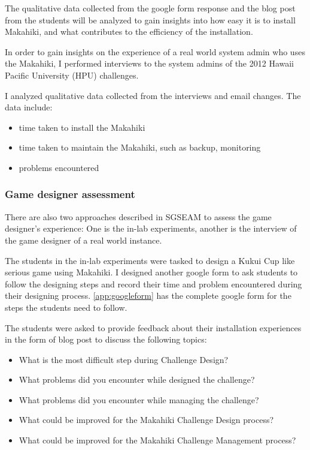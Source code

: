 The qualitative data collected from the google form response and the blog post from the students will be analyzed to gain insights into how easy it is to install Makahiki, and what contributes to the efficiency of the installation.

In order to gain insights on the experience of a real world system admin who uses the Makahiki, I performed interviews to the system admins of the 2012 Hawaii Pacific University (HPU) challenges.

I analyzed qualitative data collected from the interviews and email changes. The data include:
\begin{itemize}
 \item time taken to install the Makahiki
 \item time taken to maintain the Makahiki, such as backup, monitoring
 \item problems encountered
\end{itemize}

\subsubsection{Game designer assessment}

There are also two approaches described in SGSEAM to assess the game designer's experience: One is the in-lab experiments, another is the interview of the game designer of a real world instance.

The students in the in-lab experiments were tasked to design a Kukui Cup like serious game using Makahiki. I designed another google form to ask students to follow the designing steps and record their time and problem encountered during their designing process. \autoref{app:googleform} has the complete google form for the steps the students need to follow.

The students were asked to provide feedback about their installation experiences in the form of blog post to discuss the following topics:
\begin{itemize}
\item What is the most difficult step during Challenge Design?
\item What problems did you encounter while designed the challenge?
\item What problems did you encounter while managing the challenge?
\item What could be improved for the Makahiki Challenge Design process?
\item What could be improved for the Makahiki Challenge Management process?
\end{itemize}

